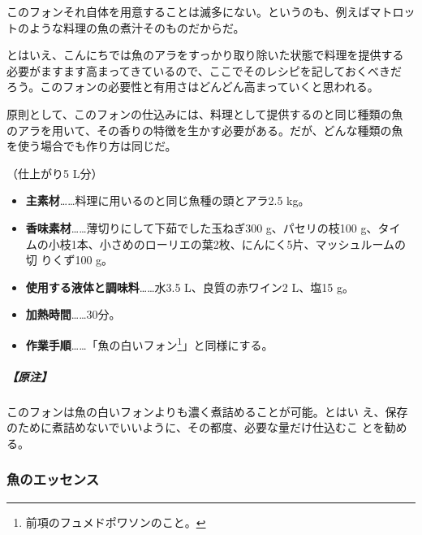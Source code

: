 \begin{recette}
このフォンそれ自体を用意することは滅多にない。というのも、例えばマトロッ
トのような料理の魚の煮汁そのものだからだ。

とはいえ、こんにちでは魚のアラをすっかり取り除いた状態で料理を提供する
必要がますます高まってきているので、ここでそのレシピを記しておくべきだ
ろう。このフォンの必要性と有用さはどんどん高まっていくと思われる。

原則として、このフォンの仕込みには、料理として提供するのと同じ種類の魚
のアラを用いて、その香りの特徴を生かす必要がある。だが、どんな種類の魚
を使う場合でも作り方は同じだ。

（仕上がり5 L分）

\begin{itemize}
\item
  \textbf{主素材}\ldots{}\ldots{}料理に用いるのと同じ魚種の頭とアラ2.5
  kg。
\item
  \textbf{香味素材}\ldots{}\ldots{}薄切りにして下茹でした玉ねぎ300
  g、パセリの枝100 g、タイ
  ムの小枝1本、小さめのローリエの葉2枚、にんにく5片、マッシュルームの切
  りくず100 g。
\item
  \textbf{使用する液体と調味料}\ldots{}\ldots{}水3.5 L、良質の赤ワイン2
  L、塩15 g。
\item
  \textbf{加熱時間}\ldots{}\ldots{}30分。
\item
  \textbf{作業手順}\ldots{}\ldots{}「魚の白いフォン\footnote{前項のフュメドポワソンのこと。}」と同様にする。
\end{itemize}

\hypertarget{nota-fonds-de-poisson-au-vin-rouge}{%
\subparagraph{【原注】}\label{nota-fonds-de-poisson-au-vin-rouge}}

このフォンは魚の白いフォンよりも濃く煮詰めることが可能。とはい
え、保存のために煮詰めないでいいように、その都度、必要な量だけ仕込むこ
とを勧める。

\maeaki

\hypertarget{essence-de-poisson}{%
\subsubsection{魚のエッセンス}\label{essence-de-poisson}}




\end{recette}
